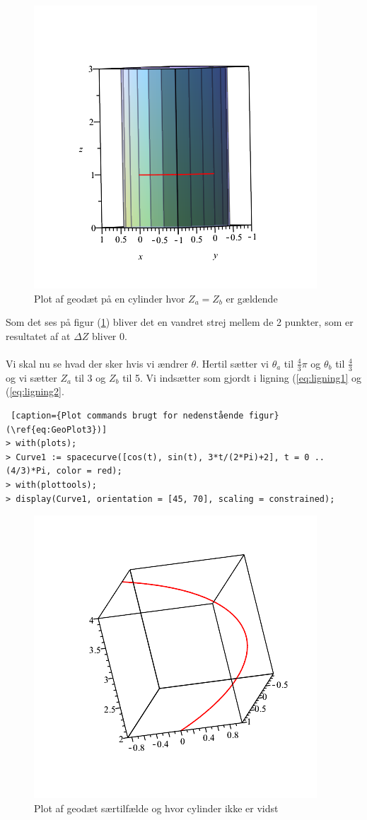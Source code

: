 \begin{figure}[ht]
\center
\includegraphics[scale=0.4]{pictures/Opg8_Figur22.png}
\caption{Plot af geodæt på en cylinder hvor $Z_a=Z_b$ er gældende}
\label{eq:GeoPlot2}
\end{figure}
Som det ses på figur (\ref{eq:GeoPlot2}) bliver det en vandret strej mellem de 2 punkter, som er resultatet af at $\Delta Z$ bliver 0.
\\
\\
Vi skal nu se hvad der sker hvis vi ændrer $\theta$. Hertil sætter vi $\theta_a$ til $\frac{4}{3} \pi$ og $\theta_b$ til $\frac{4}{3}$ og vi sætter $Z_a$ til 3 og $Z_b$ til 5. Vi indsætter som gjordt i ligning (\ref{eq:ligning1} og (\ref{eq:ligning2}.
\begin{lstlisting} [caption={Plot commands brugt for nedenstående figur}(\ref{eq:GeoPlot3})]
> with(plots);
> Curve1 := spacecurve([cos(t), sin(t), 3*t/(2*Pi)+2], t = 0 .. (4/3)*Pi, color = red);
> with(plottools);
> display(Curve1, orientation = [45, 70], scaling = constrained);
\end{lstlisting}
\begin{figure}[ht] 
\center
\includegraphics[scale=0.4]{pictures/Opg8_Figur33.png}
\caption{Plot af geodæt særtilfælde og hvor cylinder ikke er vidst}
\label{eq:GeoPlot3}
\end{figure}
